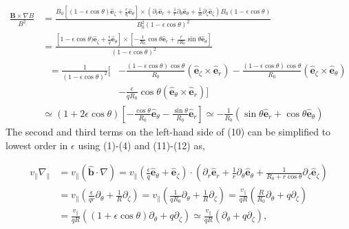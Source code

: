 \documentclass[12pt]{article}
\begin{document}
   \begin{equation}
   \begin{aligned}
      \frac{\bm{B}\times\nabla B}{B^2} &= \frac{B_0[(1-\epsilon\cos\theta)\bm{\hat{e}}_\zeta + \frac{\epsilon}{q}\bm{\hat{e}}_\theta]
      \times(\partial_r\bm{\hat{e}}_r + \frac{1}{r}\partial_\theta\bm{\hat{e}}_\theta + \frac{1}{R}\partial_\zeta\bm{\hat{e}}_\zeta)
      B_0(1-\epsilon\cos\theta)}{B_0^2(1-\epsilon\cos\theta)^2} \\ &=
      \frac{[1-\epsilon\cos\theta)\bm{\hat{e}}_\zeta + \frac{\epsilon}{q}\bm{\hat{e}}_\theta]
      \times[-\frac{1}{R_0}\cos\theta\bm{\hat{e}}_r + \frac{r}{r R_0}\sin\theta\bm{\hat{e}}_\theta]}{(1-\epsilon\cos\theta)^2} \\ &
      \begin{aligned}
         \;= \frac{1}{(1-\epsilon\cos\theta)^2}[&-\frac{(1-\epsilon\cos\theta)\cos\theta}{R_0}(\bm{\hat{e}}_\zeta\times\bm{\hat{e}}_r)
                                               -\frac{(1-\epsilon\cos\theta)\cos\theta}{R_0}(\bm{\hat{e}}_\zeta\times\bm{\hat{e}}_\theta) \\
                                              &-\frac{\epsilon}{q R_0}\cos\theta(\bm{\hat{e}}_\theta\times\bm{\hat{e}}_r)]
      \end{aligned}         
      \\ &\simeq (1+2\epsilon\cos\theta)[-\frac{\cos\theta}{R_0}\bm{\hat{e}}_\theta-\frac{\sin\theta}{R_0}\bm{\hat{e}}_r]
          \simeq -\frac{1}{R_0}(\sin\theta\bm{\hat{e}}_r + \cos\theta\bm{\hat{e}}_\theta)          
   \end{aligned}
   \end{equation}
The second and third terms on the left-hand side of (10) can be simplified to lowest order in $\epsilon$ using (1)-(4) and (11)-(12) as,
   
   \begin{equation}
   \begin{aligned}
      v_\parallel\nabla_\parallel &= 
         v_\parallel(\bm{\hat{b}}\cdot\nabla) = v_\parallel(\frac{\epsilon}{q}\bm{\hat{e}}_\theta +
         \bm{\hat{e}}_\zeta)\cdot(\partial_r\bm{\hat{e}}_r + \frac{1}{r}\partial_\theta\bm{\hat{e}}_\theta + \frac{1}{R_0 +
         r\cos\theta}\partial_\zeta\bm{\hat{e}}_\zeta) \\ &= 
         v_\parallel(\frac{\epsilon}{q r}\partial_\theta + \frac{1}{R}\partial_\zeta) = v_\parallel(\frac{1}{q R_0}\partial_\theta
         + \frac{1}{R}\partial_\zeta) = \frac{v_\parallel}{q R}(\frac{R}{R_0}\partial_\theta + q\partial_\zeta) \\ &=
         \frac{v_\parallel}{q R}((1+\epsilon\cos\theta)\partial_\theta + q\partial_\zeta)
         \simeq \frac{v_\parallel}{q R}(\partial_\theta + q\partial_\zeta),
   \end{aligned}
   \end{equation}
\end{document}

